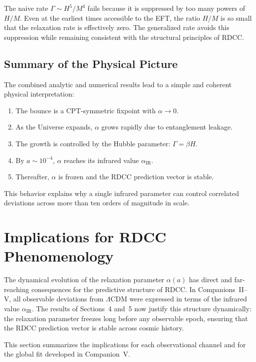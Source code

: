 \documentclass[11pt,a4paper]{article}
\begin{document}
The naive rate $\Gamma \sim H^5/M^4$ fails because it is suppressed by too many powers of
$H/M$. Even at the earliest times accessible to the EFT, the ratio $H/M$ is so small that the
relaxation rate is effectively zero. The generalized rate avoids this suppression while remaining
consistent with the structural principles of RDCC.

\subsection{Summary of the Physical Picture}

The combined analytic and numerical results lead to a simple and coherent physical
interpretation:
\begin{enumerate}
    \item The bounce is a CPT-symmetric fixpoint with $\alpha \rightarrow 0$.
    \item As the Universe expands, $\alpha$ grows rapidly due to entanglement leakage.
    \item The growth is controlled by the Hubble parameter: $\Gamma = \beta H$.
    \item By $a \sim 10^{-4}$, $\alpha$ reaches its infrared value $\alpha_{\mathrm{IR}}$.
    \item Thereafter, $\alpha$ is frozen and the RDCC prediction vector is stable.
\end{enumerate}

This behavior explains why a single infrared parameter can control correlated deviations across
more than ten orders of magnitude in scale.

\section{Implications for RDCC Phenomenology}

The dynamical evolution of the relaxation parameter $\alpha(a)$ has direct and far-reaching
consequences for the predictive structure of RDCC. In Companions~II–V, all observable
deviations from $\Lambda$CDM were expressed in terms of the infrared value $\alpha_{\mathrm{IR}}$.
The results of Sections~4 and~5 now justify this structure dynamically: the relaxation parameter
freezes long before any observable epoch, ensuring that the RDCC prediction vector is stable
across cosmic history.

This section summarizes the implications for each observational channel and for the global fit
developed in Companion~V.
\end{document}
